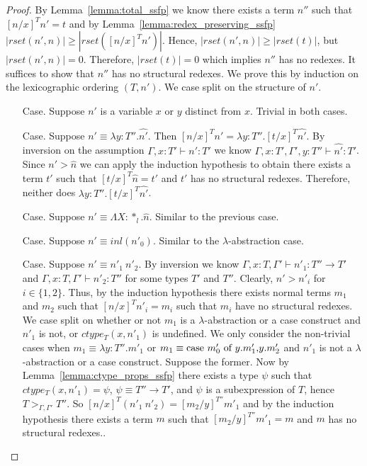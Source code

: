 \begin{proof}
  By Lemma~\ref{lemma:total_ssfp} we know there exists a term $n''$ such that $[n/x]^T n' = t$ and by 
  Lemma~\ref{lemma:redex_preserving_ssfp} 
  $|rset(n', n)| \geq |rset([n/x]^T n')|$.  Hence, $|rset(n', n)| \geq |rset(t)|$, but
  $|rset(n', n)| = 0$.  Therefore, $|rset(t)| = 0$ which implies $n''$ has no redexes.  It suffices to show
  that $n''$ has no structural redexes.  We prove this by induction on the lexicographic ordering $(T,n')$.
  We case split on the structure of $n'$.
\begin{itemize}
\item[Case.] Suppose $n'$ is a variable $x$ or $y$ distinct from $x$.  Trivial in both cases.
  
\item[Case.] Suppose $n' \equiv \lambda y:T''.\hat{n'}$.  Then
  $[n/x]^T n' = \lambda y:T''.[t/x]^T \hat{n'}$. By inversion on the assumption  
  $\Gamma, x:T' \vdash n':T'$ we know $\Gamma, x:T',\Gamma',y:T'' \vdash \hat{n'}:T'$.  Since
  $n' > \hat{n}$ we can apply the induction hypothesis to obtain there exists a term $t'$ such that
  $[t/x]^T \hat{n} = t'$ and $t'$ has no structural redexes.  Therefore, neither does 
  $\lambda y:T''.[t/x]^T \hat{n'}$.
  
\item[Case.] Suppose $n' \equiv \Lambda X:*_l.\hat{n}$.  Similar to the previous case.
  
\item[Case.] Suppose $n' \equiv inl(n'_0)$.  Similar to the $\lambda$-abstraction case.
  
\item[Case.] Suppose $n' \equiv n'_1\ n'_2$.  By inversion we know
  $\Gamma, x:T, \Gamma' \vdash n'_1 : T'' \to T'$ and
  $\Gamma, x:T, \Gamma' \vdash n'_2 : T''$ for some types $T'$ and $T''$.
  Clearly, $n' > n'_i$ for $i \in \{1,2\}$.  Thus, by the induction hypothesis
  there exists normal terms $m_1$ and $m_2$ such that $[n/x]^T n'_i = m_i$ such that $m_i$ have no
  structural redexes.  We case split on whether or not $m_1$ is a $\lambda$-abstraction
  or a case construct and $n'_1$ is not, or $ctype_T(x,n'_1)$ is undefined.  
  We only consider the non-trivial cases when 
  $m_1 \equiv \lambda y:T''.m'_1$ or $m_1 \equiv \mbox{case}\ m'_0\ \text{of}\ y\text{.}m'_1\text{,}y\text{.}m'_2$ and $n'_1$
  is not a $\lambda$-abstraction or a case construct.
  Suppose the former.  
  Now by Lemma~\ref{lemma:ctype_props_ssfp} there exists a type $\psi$ such that 
  $ctype_T(x, n'_1) = \psi$, $\psi \equiv T'' \to T'$, and $\psi$ is a subexpression
  of $T$, hence $T >_{\Gamma,\Gamma'} T''$. So $[n/x]^T (n'_1\ n'_2) = [m_2/y]^{T''} m'_1$ and
  by the induction hypothesis there exists a term $m$ such that 
  $[m_2/y]^{T''} m'_1 = m$ and $m$ has no structural redexes..  
  

\end{itemize}
\end{proof}
